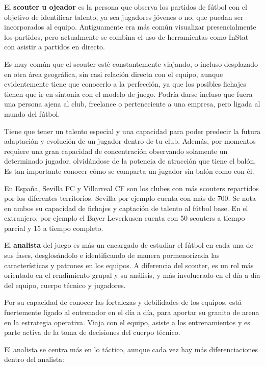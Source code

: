 El \textbf{scouter u ojeador} es la persona que observa los partidos de 
fútbol con el objetivo de identificar talento, ya sea jugadores 
jóvenes o no, que puedan ser incorporados al equipo. Antiguamente 
era más común visualizar presencialmente los partidos, pero 
actualmente se combina el uso de herramientas como InStat 
con asistir a partidos en directo.

Es muy común que el scouter esté constantemente viajando, o incluso 
desplazado en otra área geográfica, sin casi relación directa 
con el equipo, aunque evidentemente tiene que conocerlo a la 
perfección, ya que los posibles fichajes tienen que ir en 
sintonía con el modelo de juego. Podría darse incluso que fuera 
una persona ajena al club, freelance o perteneciente a una empresa, 
pero ligada al mundo del fútbol.

Tiene que tener un talento especial y una capacidad para poder 
predecir la futura adaptación y evolución de un jugador dentro 
de tu club. Además, por momentos requiere una gran capacidad de 
concentración observando solamente un determinado jugador, 
olvidándose de la potencia de atracción que tiene el balón. 
Es tan importante conocer cómo se comparta un jugador sin 
balón como con él.

En España, Sevilla FC y  Villarreal CF son los clubes con más 
scouters repartidos por los diferentes territorios. Sevilla por ejemplo
cuenta con más de 700. Se nota en ambos su capacidad de fichajes 
y captación de talento al fútbol base. En el extranjero, por 
ejemplo el Bayer Leverkusen cuenta con 50 scouters a tiempo parcial 
y 15 a tiempo completo.

El \textbf{analista} del juego es más un encargado de estudiar el 
fútbol en cada una de sus fases, desglosándolo e identificando 
de manera pormenorizada las características y patrones en los 
equipos. A diferencia del scouter, es un rol más orientado 
en el rendimiento grupal y su análisis, y más involucrado 
en el día a día del equipo, cuerpo técnico y jugadores.

Por su capacidad de conocer las fortalezas y debilidades de 
los equipos, está fuertemente ligado al entrenador en el 
día a día, para aportar su granito de arena en la estrategia 
operativa. Viaja con el equipo, asiste a los entrenamientos 
y es parte activa de la toma de decisiones del cuerpo técnico.

El analista se centra más en lo táctico, aunque cada vez hay 
más diferenciaciones dentro del analista:

